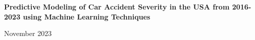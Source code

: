\begin{titlepage}
    \begin{center}
        \null
        \vfill
            
        \Large
        \textbf{Predictive Modeling of Car Accident Severity in the USA from 2016-2023 using Machine Learning Techniques}
            
        \vspace{1.5cm}
        
        \large
        
        November 2023
        
        \vfill
    \end{center}
\end{titlepage}
